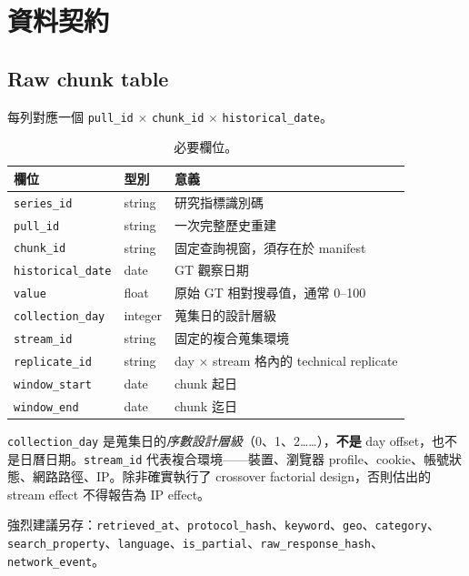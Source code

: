 \documentclass[12pt,a4paper,oneside]{article}
\begin{document}
\section{資料契約}\label{sec:contract-zh}

\subsection{Raw chunk table}

每列對應一個 \texttt{pull\_id} $\times$ \texttt{chunk\_id} $\times$ \texttt{historical\_date}。

\begin{table}[H]
\centering\small
\caption{必要欄位。}
\begin{tabularx}{\textwidth}{llX}
\toprule
欄位 & 型別 & 意義\\
\midrule
\texttt{series\_id} & string & 研究指標識別碼\\
\texttt{pull\_id} & string & 一次完整歷史重建\\
\texttt{chunk\_id} & string & 固定查詢視窗，須存在於 manifest\\
\texttt{historical\_date} & date & GT 觀察日期\\
\texttt{value} & float & 原始 GT 相對搜尋值，通常 0--100\\
\texttt{collection\_day} & integer & 蒐集日的設計層級\\
\texttt{stream\_id} & string & 固定的複合蒐集環境\\
\texttt{replicate\_id} & string & day $\times$ stream 格內的 technical replicate\\
\texttt{window\_start} & date & chunk 起日\\
\texttt{window\_end} & date & chunk 迄日\\
\bottomrule
\end{tabularx}
\end{table}

\begin{remark}[兩個經常被誤解的欄位]
\texttt{collection\_day} 是蒐集日的\emph{序數設計層級}（0、1、2……），\textbf{不是} day offset，也不是日曆日期。\texttt{stream\_id} 代表複合環境——裝置、瀏覽器 profile、cookie、帳號狀態、網路路徑、IP。除非確實執行了 crossover factorial design，否則估出的 stream effect 不得報告為 IP effect。
\end{remark}

強烈建議另存：\texttt{retrieved\_at}、\texttt{protocol\_hash}、\texttt{keyword}、\texttt{geo}、\texttt{category}、\texttt{search\_property}、\texttt{language}、\texttt{is\_partial}、\texttt{raw\_response\_hash}、\texttt{network\_event}。
\end{document}
